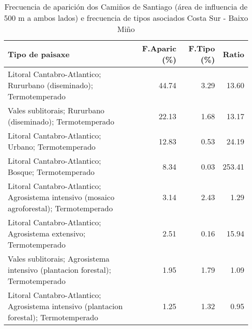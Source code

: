 \begin{table}[p]
\centering
\caption{Frecuencia de aparición dos Camiños de Santiago (área de influencia de 500 m a ambos lados) e frecuencia de tipos asociados Costa Sur - Baixo Miño} 
\label{vcamino3}
\begin{tabular}{lrrr}
  \hline
Tipo de paisaxe & F.Aparic (\%) & F.Tipo (\%) & Ratio \\ 
  \hline
Litoral Cantabro-Atlantico; Rururbano (diseminado); Termotemperado & 44.74 & 3.29 & 13.60 \\ 
  Vales sublitorais; Rururbano (diseminado); Termotemperado & 22.13 & 1.68 & 13.17 \\ 
  Litoral Cantabro-Atlantico; Urbano; Termotemperado & 12.83 & 0.53 & 24.19 \\ 
  Litoral Cantabro-Atlantico; Bosque; Termotemperado & 8.34 & 0.03 & 253.41 \\ 
  Litoral Cantabro-Atlantico; Agrosistema intensivo (mosaico agroforestal); Termotemperado & 3.14 & 2.43 & 1.29 \\ 
  Litoral Cantabro-Atlantico; Agrosistema extensivo; Termotemperado & 2.51 & 0.16 & 15.94 \\ 
  Vales sublitorais; Agrosistema intensivo (plantacion forestal); Termotemperado & 1.95 & 1.79 & 1.09 \\ 
  Litoral Cantabro-Atlantico; Agrosistema intensivo (plantacion forestal); Termotemperado & 1.25 & 1.32 & 0.95 \\ 
   \hline
\end{tabular}
\end{table}
